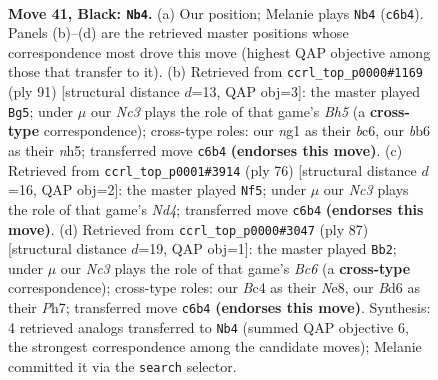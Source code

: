 \documentclass[11pt]{article}
\begin{document}
\clearpage

\begin{figure}[p]\centering
\begin{subfigure}{0.46\textwidth}\centering
\resizebox{\linewidth}{!}{%
\newchessgame
\chessboard[
  setfen={2k5/8/1Bnb2p1/6P1/p1b5/8/8/4K1N1 b - - 17 41},
  showmover=false,
  pgfstyle=straightmove, color=movearrow, markmove={c6-b4}
]}
\caption{}
\end{subfigure}\hfill
\begin{subfigure}{0.46\textwidth}\centering
\resizebox{\linewidth}{!}{%
\newchessgame
\chessboard[
  setfen={7k/8/2B5/7N/1p5b/1P2n3/6P1/2K5 b - - 0 46},
  showmover=false,
  pgfstyle=straightmove, color=movearrow, markmove={h4-g5}
]}
\caption{}
\end{subfigure}
\\[4pt]
\begin{subfigure}{0.46\textwidth}\centering
\resizebox{\linewidth}{!}{%
\newchessgame
\chessboard[
  setfen={8/1bn5/5k1p/8/3N2P1/3B4/8/5K2 w - - 0 39},
  showmover=false,
  pgfstyle=straightmove, color=movearrow, markmove={d4-f5}
]}
\caption{}
\end{subfigure}\hfill
\begin{subfigure}{0.46\textwidth}\centering
\resizebox{\linewidth}{!}{%
\newchessgame
\chessboard[
  setfen={4nk2/7p/8/5K2/7P/2bBPN2/8/8 b - - 14 44},
  showmover=false,
  pgfstyle=straightmove, color=movearrow, markmove={c3-b2}
]}
\caption{}
\end{subfigure}
\caption{\textbf{Move 41, Black: \texttt{Nb4}.} (a) Our position; Melanie plays \texttt{Nb4} (\texttt{c6b4}). Panels (b)--(d) are the retrieved master positions whose correspondence most drove this move (highest QAP objective among those that transfer to it). (b) Retrieved from \texttt{ccrl\_top\_p0000\#1169} (ply 91) [structural distance $d$=13, QAP obj=3]: the master played \texttt{Bg5}; under $\mu$ our \emph{Nc3} plays the role of that game's \emph{Bh5} (a \textbf{cross-type} correspondence); cross-type roles: our \emph{n}g1 as their \emph{b}c6, our \emph{b}b6 as their \emph{n}h5; transferred move \texttt{c6b4} \textbf{(endorses this move)}. (c) Retrieved from \texttt{ccrl\_top\_p0001\#3914} (ply 76) [structural distance $d$=16, QAP obj=2]: the master played \texttt{Nf5}; under $\mu$ our \emph{Nc3} plays the role of that game's \emph{Nd4}; transferred move \texttt{c6b4} \textbf{(endorses this move)}. (d) Retrieved from \texttt{ccrl\_top\_p0000\#3047} (ply 87) [structural distance $d$=19, QAP obj=1]: the master played \texttt{Bb2}; under $\mu$ our \emph{Nc3} plays the role of that game's \emph{Bc6} (a \textbf{cross-type} correspondence); cross-type roles: our \emph{B}c4 as their \emph{N}e8, our \emph{B}d6 as their \emph{P}h7; transferred move \texttt{c6b4} \textbf{(endorses this move)}. Synthesis: 4 retrieved analogs transferred to \texttt{Nb4} (summed QAP objective 6, the strongest correspondence among the candidate moves); Melanie committed it via the \texttt{search} selector.}
\label{fig:thought-m81}
\end{figure}
\end{document}

